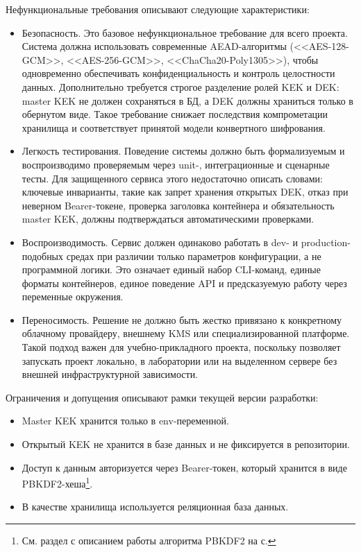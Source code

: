 \documentclass[14pt, a4paper]{extarticle}
\begin{document}
	Нефункциональные требования описывают следующие характеристики:
	
	\begin{itemize}
		\item Безопасность. Это базовое нефункциональное требование для всего проекта. Система должна использовать современные AEAD-алгоритмы (<<AES-128-GCM>>, <<AES-256-GCM>>, <<ChaCha20-Poly1305>>), чтобы одновременно обеспечивать конфиденциальность и контроль целостности данных. Дополнительно требуется строгое разделение ролей KEK и DEK: master KEK не должен сохраняться в БД, а DEK должны храниться только в обернутом виде. Такое требование снижает последствия компрометации хранилища и соответствует принятой модели конвертного шифрования.
		\item Легкость тестирования. Поведение системы должно быть формализуемым и воспроизводимо проверяемым через unit-, интеграционные и сценарные тесты. Для защищенного сервиса этого недостаточно описать словами: ключевые инварианты, такие как запрет хранения открытых DEK, отказ при неверном Bearer-токене, проверка заголовка контейнера и обязательность master KEK, должны подтверждаться автоматическими проверками.
		\item Воспроизводимость. Сервис должен одинаково работать в dev- и production-подобных средах при различии только параметров конфигурации, а не программной логики. Это означает единый набор CLI-команд, единые форматы контейнеров, единое поведение API и предсказуемую работу через переменные окружения.
		\item Переносимость. Решение не должно быть жестко привязано к конкретному облачному провайдеру, внешнему KMS или специализированной платформе. Такой подход важен для учебно-прикладного проекта, поскольку позволяет запускать проект локально, в лаборатории или на выделенном сервере без внешней инфраструктурной зависимости.
	\end{itemize}
	
	Ограничения и допущения описывают рамки текущей версии разработки:
	
	\begin{itemize}
	\item Master KEK хранится только в env-переменной.
	\item Открытый KEK не хранится в базе данных и не фиксируется в репозитории.
	\item Доступ к данным авторизуется через Bearer-токен, который хранится в виде PBKDF2-хеша\footnote{См. раздел с описанием работы алгоритма PBKDF2 на с. \pageref{def:PBKDF2}}.
	\item В качестве хранилища используется реляционная база данных.
	\end{itemize}
	
\end{document}
